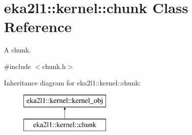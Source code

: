 \hypertarget{classeka2l1_1_1kernel_1_1chunk}{}\section{eka2l1\+:\+:kernel\+:\+:chunk Class Reference}
\label{classeka2l1_1_1kernel_1_1chunk}


A chunk.  




{\ttfamily \#include $<$chunk.\+h$>$}

Inheritance diagram for eka2l1\+:\+:kernel\+:\+:chunk\+:\begin{figure}[H]
\begin{center}
\leavevmode
\includegraphics[height=2.000000cm]{classeka2l1_1_1kernel_1_1chunk}
\end{center}
\end{figure}
